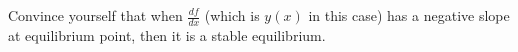 \begin{questions}
\begin{solution}
    Convince yourself that when $\frac{df}{dx}$ (which is $y(x)$ in this case)
    has a negative slope at equilibrium point, then it is a stable equilibrium.
    
\end{solution}

\end{questions}

